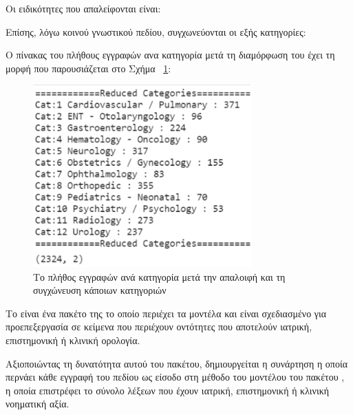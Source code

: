 Οι ειδικότητες που απαλείφονται είναι: 
\begin{enumerate}
\end{enumerate}


Επίσης, λόγω κοινού γνωστικού πεδίου, συγχωνεύονται οι εξής κατηγορίες:
\begin{enumerate}
\end{enumerate}

Ο πίνακας του πλήθους εγγραφών ανα κατηγορία μετά τη διαμόρφωση του έχει τη μορφή που παρουσιάζεται στο Σχήμα ~\ref{figure5.5}:
\begin{figure} [ht!]
\centering
\includegraphics[width=\textwidth,height=7cm,keepaspectratio]{pictures/5.4reducedCat(12cat).png} 
\caption{Το πλήθος εγγραφών ανά κατηγορία μετά την απαλοιφή και τη συγχώνευση κάποιων κατηγοριών}\label{figure5.5}
\end{figure}


Το  είναι ένα πακέτο της   το οποίο περιέχει τα μοντέλα   και είναι σχεδιασμένο για προεπεξεργασία σε κείμενα που περιέχουν οντότητες που αποτελούν ιατρική, επιστημονική ή κλινική ορολογία.

Αξιοποιώντας τη δυνατότητα αυτού του πακέτου, δημιουργείται η συνάρτηση  η οποία περνάει κάθε εγγραφή του πεδίου  ως είσοδο στη μέθοδο  του μοντέλου  του πακέτου , η οποία επιστρέφει το σύνολο λέξεων που έχουν ιατρική, επιστημονική ή κλινική νοηματική αξία.


